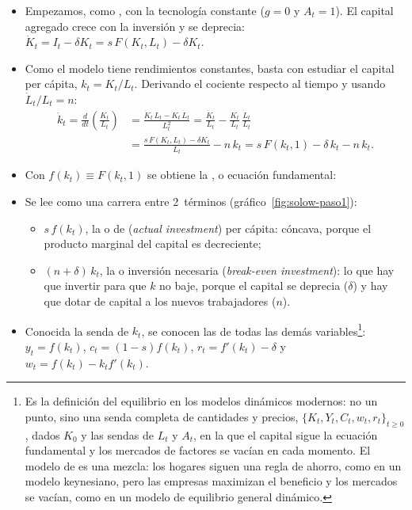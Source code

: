 \documentclass[11pt]{article}
\begin{document}
\begin{itemize}
\item Empezamos, como , con la tecnología constante ($g=0$ y $A_t=1$). El capital agregado crece con la inversión y se deprecia: $\dot K_t=I_t-\delta K_t=s\,F(K_t,L_t)-\delta K_t$.
\item Como el modelo tiene rendimientos constantes, basta con estudiar el capital per cápita, $k_t=K_t/L_t$. Derivando el cociente respecto al tiempo y usando $\dot L_t/L_t=n$:
  \begin{align*}
  \dot k_t=\frac{d}{dt}\left(\frac{K_t}{L_t}\right)&=\frac{\dot K_t\,L_t-K_t\,\dot L_t}{L_t^2}=\frac{\dot K_t}{L_t}-\frac{K_t}{L_t}\,\frac{\dot L_t}{L_t}\\
  &=\frac{s\,F(K_t,L_t)-\delta K_t}{L_t}-n\,k_t=s\,F(k_t,1)-\delta\,k_t-n\,k_t.
  \end{align*}
\item Con $f(k_t)\equiv F(k_t,1)$ se obtiene la , o ecuación fundamental:
\item Se lee como una carrera entre 2~términos (gráfico~\ref{fig:solow-paso1}):
  \begin{itemize}
  \item $s\,f(k_t)$, la  o de  (\emph{actual investment}) per cápita: cóncava, porque el producto marginal del capital es decreciente;
  \item $(n+\delta)\,k_t$, la  o inversión necesaria (\emph{break-even investment}): lo que hay que invertir para que $k$ no baje, porque el capital se deprecia ($\delta$) y hay que dotar de capital a los nuevos trabajadores ($n$).
  \end{itemize}
\item Conocida la senda de $k_t$, se conocen las de todas las demás variables\footnote{Es la definición del equilibrio en los modelos dinámicos modernos: no un punto, sino una senda completa de cantidades y precios, $\{K_t,Y_t,C_t,w_t,r_t\}_{t\geq0}$, dados $K_0$ y las sendas de $L_t$ y $A_t$, en la que el capital sigue la ecuación fundamental y los mercados de factores se vacían en cada momento\nocite{Acemoglu2009}. El modelo de  es una mezcla: los hogares siguen una regla de ahorro, como en un modelo keynesiano, pero las empresas maximizan el beneficio y los mercados se vacían, como en un modelo de equilibrio general dinámico.}: $y_t=f(k_t)$, $c_t=(1-s)f(k_t)$, $r_t=f'(k_t)-\delta$ y $w_t=f(k_t)-k_tf'(k_t)$.
\end{itemize}
\end{document}
